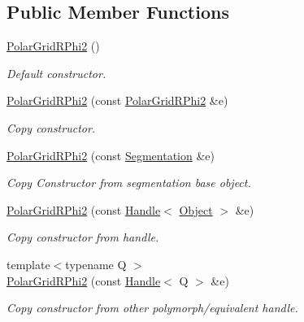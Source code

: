 \subsection*{Public Member Functions}
\begin{DoxyCompactItemize}
\item 
\hyperlink{class_d_d4hep_1_1_geometry_1_1_polar_grid_r_phi2_a9650d9923ef8f1efdcad95c6ad1b4de9}{PolarGridRPhi2} ()
\begin{DoxyCompactList}\small\item\em Default constructor. \item\end{DoxyCompactList}\item 
\hyperlink{class_d_d4hep_1_1_geometry_1_1_polar_grid_r_phi2_a50631fa89d469ba5fa053c871d6ac608}{PolarGridRPhi2} (const \hyperlink{class_d_d4hep_1_1_geometry_1_1_polar_grid_r_phi2}{PolarGridRPhi2} \&e)
\begin{DoxyCompactList}\small\item\em Copy constructor. \item\end{DoxyCompactList}\item 
\hyperlink{class_d_d4hep_1_1_geometry_1_1_polar_grid_r_phi2_ae6c860e736ccd4a3b167d3c5d1d32e0d}{PolarGridRPhi2} (const \hyperlink{class_d_d4hep_1_1_geometry_1_1_segmentation}{Segmentation} \&e)
\begin{DoxyCompactList}\small\item\em Copy Constructor from segmentation base object. \item\end{DoxyCompactList}\item 
\hyperlink{class_d_d4hep_1_1_geometry_1_1_polar_grid_r_phi2_aa270f3cab4cb31978e5476dc0db849f3}{PolarGridRPhi2} (const \hyperlink{class_d_d4hep_1_1_handle}{Handle}$<$ \hyperlink{class_t}{Object} $>$ \&e)
\begin{DoxyCompactList}\small\item\em Copy constructor from handle. \item\end{DoxyCompactList}\item 
{\footnotesize template$<$typename Q $>$ }\\\hyperlink{class_d_d4hep_1_1_geometry_1_1_polar_grid_r_phi2_ab9a185d92431a79e21acf425c782ae38}{PolarGridRPhi2} (const \hyperlink{class_d_d4hep_1_1_handle}{Handle}$<$ Q $>$ \&e)
\begin{DoxyCompactList}\small\item\em Copy constructor from other polymorph/equivalent handle. \item\end{DoxyCompactList}\item 

\end{DoxyCompactItemize}
